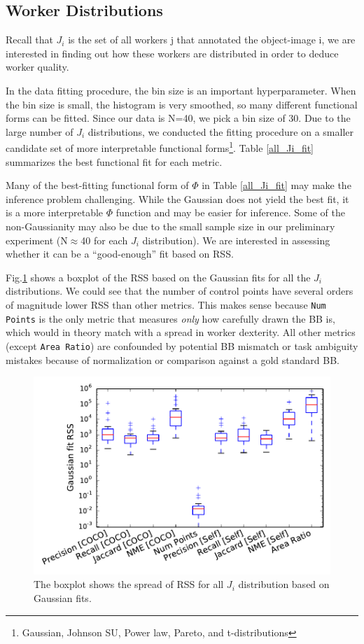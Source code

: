 \documentclass[12pt]{article}
\begin{document}
\subsection{Worker Distributions}
\par Recall that $J_i$  is the set of all workers j that annotated the object-image i, we are interested in finding out how these workers are distributed in order to deduce worker quality. 
\par In the data fitting procedure, the bin size is an important hyperparameter. When the bin size is small, the histogram is very smoothed, so many different functional forms can be fitted. Since our data is N=40, we pick a bin size of 30. Due to the large number of $J_i$ distributions, we conducted the fitting procedure on a smaller candidate set of more interpretable functional forms\footnote{Gaussian, Johnson SU, Power law, Pareto, and t-distributions}. Table \ref{all_Ji_fit} summarizes the best functional fit for each metric. 
\par Many of the best-fitting functional form of $\Phi$ in Table \ref{all_Ji_fit} may make the inference problem challenging.  While the Gaussian does not yield the best fit, it is a more interpretable $\Phi$ function and may be easier for inference. Some of the non-Gaussianity may also be due to the small sample size in our preliminary experiment (N$\approx$40 for each $J_i$ distribution). We are interested in assessing whether it can be a ``good-enough'' fit based on RSS. 
\par Fig.\ref{GaussRSSBox} shows a boxplot of the RSS based on the Gaussian fits for all the $J_i$ distributions. We could see that the number of control points have several orders of magnitude lower RSS than other metrics. This makes sense because \texttt{Num Points} is the only metric that measures \textit{only} how carefully drawn the BB is, which would in theory match with a spread in worker dexterity. All other metrics (except \texttt{Area Ratio}) are confounded by potential BB mismatch or task ambiguity mistakes because of normalization or comparison against a gold standard BB. 
\begin{figure}[ht]
\centering
\includegraphics[width=0.6\linewidth]{plots/GaussianRSSBoxplot.pdf}
\caption{The boxplot shows the spread of RSS for all $J_i$ distribution based on Gaussian fits.}
\label{GaussRSSBox}
\end{figure}
\end{document}
